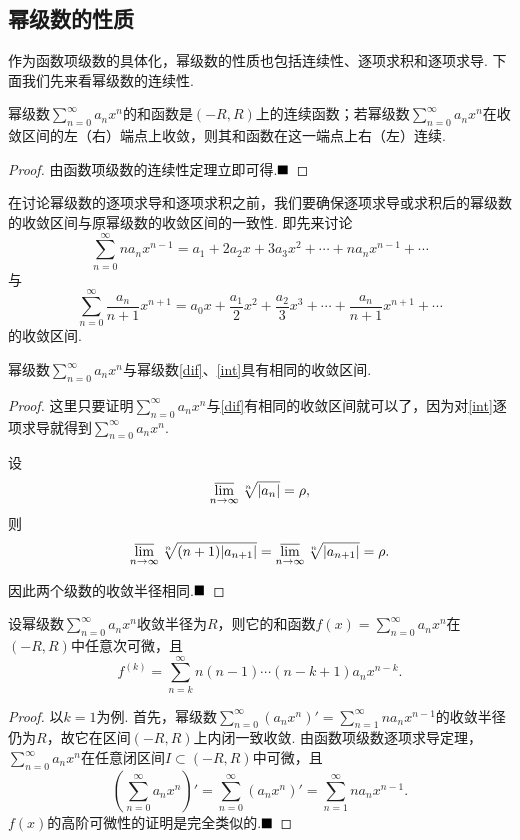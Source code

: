 \subsection{幂级数的性质}
作为函数项级数的具体化，幂级数的性质也包括连续性、逐项求积和逐项求导. 下面我们先来看幂级数的连续性.
\begin{theorem}[连续性]
	幂级数$\displaystyle\sum_{n=0}^{\infty}a_nx^n$的和函数是$(-R,R)$上的连续函数；若幂级数$\displaystyle\sum_{n=0}^{\infty}a_nx^n$在收敛区间的左（右）端点上收敛，则其和函数在这一端点上右（左）连续.
\end{theorem}
\begin{proof}
	由函数项级数的连续性定理立即可得.$\hfill\blacksquare$
\end{proof}
在讨论幂级数的逐项求导和逐项求积之前，我们要确保逐项求导或求积后的幂级数的收敛区间与原幂级数的收敛区间的一致性. 即先来讨论
\begin{equation}\label{dif}
	\sum_{n=0}^{\infty}na_nx^{n-1}=a_1+2a_2x+3a_3x^2+\cdots+na_nx^{n-1}+\cdots
\end{equation}
与
\begin{equation}\label{int}
	\sum_{n=0}^{\infty}\frac{a_n}{n+1}x^{n+1}=a_0x+\frac{a_1}{2}x^2+\frac{a_2}{3}x^3+\cdots+\frac{a_n}{n+1}x^{n+1}+\cdots
\end{equation}
的收敛区间.
\begin{theorem}
	幂级数$\displaystyle\sum_{n=0}^{\infty}a_nx^n$与幂级数\ref{dif}、\ref{int}具有相同的收敛区间.
\end{theorem}
\begin{proof}
	这里只要证明$\displaystyle\sum_{n=0}^{\infty}a_nx^n$与\ref{dif}有相同的收敛区间就可以了，因为对\ref{int}逐项求导就得到$\displaystyle\sum_{n=0}^{\infty}a_nx^n$.
	
	设
	$$\varlimsup\limits_{n\to\infty}\sqrt[n]{|a_n|}=\rho,$$
	则
	$$\varlimsup\limits_{n\to\infty}\sqrt[n]{(n+1)|a_{n+1}|}=\varlimsup\limits_{n\to\infty}\sqrt[n]{|a_{n+1}|}=\rho.$$
	
	因此两个级数的收敛半径相同.$\hfill\blacksquare$	
\end{proof}
\begin{theorem}[任意次可微]
	设幂级数$\displaystyle\sum_{n=0}^{\infty}a_nx^n$收敛半径为$R$，则它的和函数$f(x)=\displaystyle\sum_{n=0}^{\infty}a_nx^n$在$(-R,R)$中任意次可微，且
	$$f^{(k)}=\sum_{n=k}^{\infty}n(n-1)\cdots(n-k+1)a_nx^{n-k}.$$
\end{theorem}
\begin{proof}
	以$k=1$为例. 首先，幂级数$\displaystyle\sum_{n=0}^{\infty}(a_nx^n)'=\displaystyle\sum_{n=1}^{\infty}na_nx^{n-1}$的收敛半径仍为$R$，故它在区间$(-R,R)$上内闭一致收敛. 由函数项级数逐项求导定理，$\displaystyle\sum_{n=0}^{\infty}a_nx^n$在任意闭区间$I\subset (-R,R)$中可微，且
	$$\left(\sum_{n=0}^{\infty}a_nx^n\right)'=\sum_{n=0}^{\infty}(a_nx^n)'=\sum_{n=1}^{\infty}na_nx^{n-1}.$$
	$f(x)$的高阶可微性的证明是完全类似的.$\hfill\blacksquare$
\end{proof}
